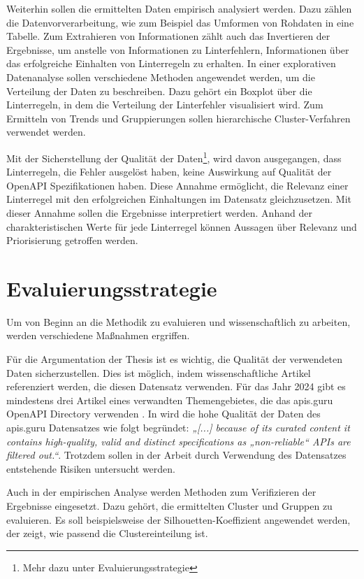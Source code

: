 Weiterhin sollen die ermittelten Daten empirisch analysiert werden. Dazu zählen die Datenvorverarbeitung, wie zum Beispiel das Umformen von Rohdaten in eine Tabelle. Zum Extrahieren von Informationen zählt  auch das Invertieren der Ergebnisse, um anstelle von Informationen zu Linterfehlern, Informationen über das erfolgreiche Einhalten von Linterregeln zu erhalten. In einer explorativen Datenanalyse sollen verschiedene Methoden angewendet werden, um die Verteilung der Daten zu beschreiben. Dazu gehört ein Boxplot über die Linterregeln, in dem die Verteilung der Linterfehler visualisiert wird. Zum Ermitteln von Trends und Gruppierungen sollen hierarchische Cluster-Verfahren verwendet werden.

Mit der Sicherstellung der Qualität der Daten\footnote{Mehr dazu unter Evaluierungsstrategie}, wird davon ausgegangen, dass Linterregeln, die Fehler ausgelöst haben, keine Auswirkung auf Qualität der OpenAPI Spezifikationen haben. Diese Annahme ermöglicht, die Relevanz einer Linterregel mit den erfolgreichen Einhaltungen im Datensatz gleichzusetzen. Mit dieser Annahme sollen die Ergebnisse interpretiert werden. Anhand der charakteristischen Werte für jede Linterregel können Aussagen über Relevanz und Priorisierung getroffen werden.




\section{Evaluierungsstrategie}
Um von Beginn an die Methodik zu evaluieren und wissenschaftlich zu arbeiten, werden verschiedene Maßnahmen ergriffen.

Für die Argumentation der Thesis ist es wichtig, die Qualität der verwendeten Daten sicherzustellen.
Dies ist möglich, indem wissenschaftliche Artikel referenziert werden, die diesen Datensatz verwenden. Für das Jahr 2024 gibt es mindestens drei Artikel eines verwandten Themengebietes, die das apis.guru OpenAPI Directory verwenden \parencite{bogner_restruler_2024}\parencite{serbout_apistic_2024}\parencite{kim_leveraging_2024}. In \parencite{serbout_apistic_2024} wird die hohe Qualität der Daten des apis.guru Datensatzes wie folgt begründet: \textit{„[...] because of its curated content it contains
high-quality, valid and distinct specifications as „non-reliable“ APIs
are filtered out.“}. Trotzdem sollen in der Arbeit durch Verwendung des Datensatzes entstehende Risiken untersucht werden.

Auch in der empirischen Analyse werden Methoden zum Verifizieren der Ergebnisse eingesetzt. Dazu gehört, die ermittelten Cluster und Gruppen zu evaluieren. Es soll beispielsweise der Silhouetten-Koeffizient angewendet werden, der zeigt, wie passend die Clustereinteilung ist.


